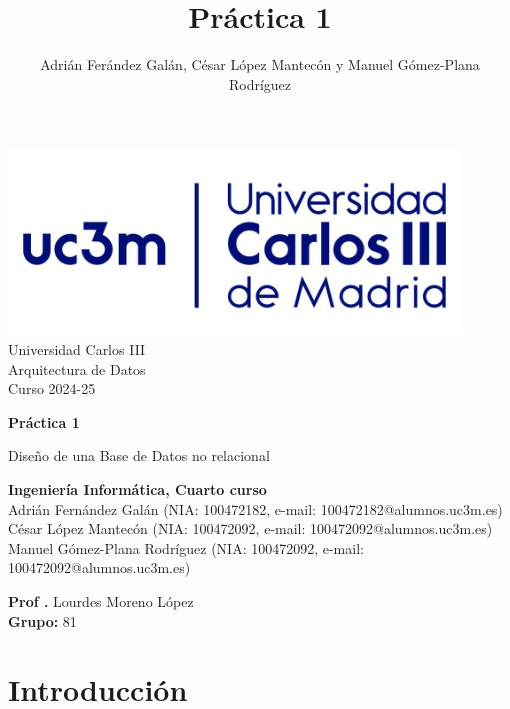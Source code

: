 \documentclass[]{article}
\title{Práctica 1}
\author{Adrián Ferández Galán, César López Mantecón y Manuel Gómez-Plana Rodríguez}
\begin{document}
\begin{titlepage}
    \centering
   \includegraphics[width=0.9\textwidth]{uc3m.jpg} 
    {\Huge Universidad Carlos III\\
    
     \Large Arquitectura de Datos\\
     \vspace{0.5cm}
     Curso 2024-25}
    \vspace{2cm}

    {\Huge \textbf{Práctica 1} \par}
    \vspace{0.5cm}
    {\Large Diseño de una Base de Datos no relacional \par}
    \vspace{8cm}

   \textbf{Ingeniería Informática, Cuarto curso}\\
    \vspace{0.2cm} 
    Adrián Fernández Galán       (NIA: 100472182, e-mail: 100472182@alumnos.uc3m.es) \\
    César López Mantecón         (NIA: 100472092, e-mail: 100472092@alumnos.uc3m.es)\\
    Manuel Gómez-Plana Rodríguez (NIA: 100472092, e-mail: 100472092@alumnos.uc3m.es)
    \vspace{0.5cm}

   
    \textbf{Prof .} Lourdes Moreno López\\
    
    \textbf{Grupo: } 81   
    
\end{titlepage}
\newpage

\renewcommand{\contentsname}{\centering Índice}
\tableofcontents

\newpage

\section{Introducción}
\label{sec:introduccion}
\end{document}
